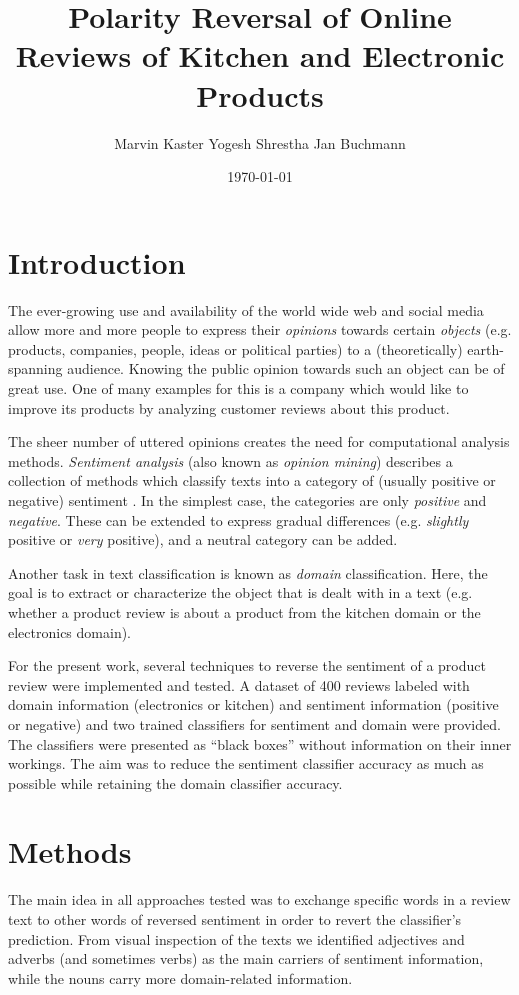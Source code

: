 \documentclass[11pt,a4paper]{article}
\title{Polarity Reversal of Online Reviews of Kitchen and Electronic Products}
\author{Marvin Kaster \And Yogesh Shrestha \And Jan Buchmann}
\date{\today}
\begin{document}
\maketitle


\section{Introduction}
The ever-growing use and availability of the world wide web and social media allow more and more people to express their \textit{opinions} towards certain \textit{objects} (e.g. products, companies, people, ideas or political parties) to a (theoretically) earth-spanning audience. Knowing the public opinion towards such an object can be of great use. One of many examples for this is a company which would like to improve its products by analyzing customer reviews about this product.

The sheer number of uttered opinions creates the need for computational analysis methods. \textit{Sentiment analysis} (also known as \textit{opinion mining}) describes a collection of methods which classify texts into a category of (usually positive or negative) sentiment \citep{Liu2012}. In the simplest case, the categories are only \textit{positive} and \textit{negative}. These can be extended to express gradual differences (e.g. \textit{slightly} positive or \textit{very} positive), and a neutral category can be added.

Another task in text classification is known as \textit{domain} classification. Here, the goal is to extract or characterize the object that is dealt with in a text (e.g. whether a product review is about a product from the kitchen domain or the electronics domain). 

For the present work, several techniques   to reverse the sentiment of a product review were implemented and tested. A dataset of 400 reviews labeled with domain information (electronics or kitchen) and sentiment information (positive or negative) and two trained classifiers for sentiment and domain were provided. The classifiers were presented as ``black boxes'' without information on their inner workings. The aim was to reduce the sentiment classifier accuracy as much as possible while retaining the domain classifier accuracy.

\section{Methods}
The main idea in all approaches tested was to exchange specific words in a review text to other words of reversed sentiment in order to revert the classifier’s prediction. From visual inspection of the texts we identified adjectives and adverbs (and sometimes verbs) as the main carriers of sentiment information, while the nouns carry more domain-related information.
\end{document}

